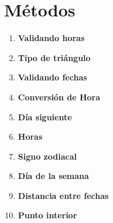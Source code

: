 \newpage
\section{Métodos}
\begin{enumerate}
    \item \textbf{Validando horas}\\
    

     \item \textbf{Tipo de triángulo}\\
    

    \item \textbf{Validando fechas}\\
    
    
    \item \textbf{Conversión de Hora} \\
    

    \item \textbf{Día siguiente}\\
    

    \item \textbf{Horas}
    

    \item \textbf{Signo zodiacal}\\
    

    \item \textbf{Día de la semana}\\
    

    \item \textbf{Distancia entre fechas}\\
    

    \item \textbf{Punto interior}\\
    
\end{enumerate}

\newpage
